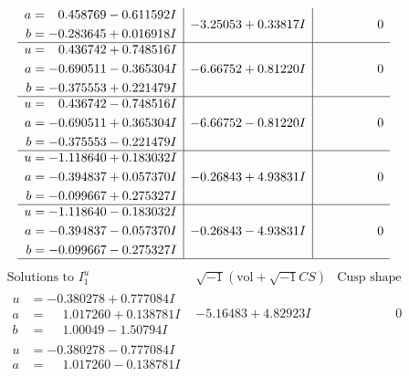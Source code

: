 \documentclass[1p]{elsarticle_modified}
\theoremstyle{definition}
\newcommand{\I}{\sqrt{-1}}
\begin{document}
$$\begin{array}{c|c|c}
\begin{aligned}
a &= \phantom{-}0.458769 - 0.611592 I \\
b &= -0.283645 + 0.016918 I\end{aligned}
 & -3.25053 + 0.33817 I & \phantom{-0.000000 } 0 \\ \hline\begin{aligned}
u &= \phantom{-}0.436742 + 0.748516 I \\
a &= -0.690511 - 0.365304 I \\
b &= -0.375553 + 0.221479 I\end{aligned}
 & -6.66752 + 0.81220 I & \phantom{-0.000000 } 0 \\ \hline\begin{aligned}
u &= \phantom{-}0.436742 - 0.748516 I \\
a &= -0.690511 + 0.365304 I \\
b &= -0.375553 - 0.221479 I\end{aligned}
 & -6.66752 - 0.81220 I & \phantom{-0.000000 } 0 \\ \hline\begin{aligned}
u &= -1.118640 + 0.183032 I \\
a &= -0.394837 + 0.057370 I \\
b &= -0.099667 + 0.275327 I\end{aligned}
 & -0.26843 + 4.93831 I & \phantom{-0.000000 } 0 \\ \hline\begin{aligned}
u &= -1.118640 - 0.183032 I \\
a &= -0.394837 - 0.057370 I \\
b &= -0.099667 - 0.275327 I\end{aligned}
 & -0.26843 - 4.93831 I & \phantom{-0.000000 } 0\\
 \hline 
 \end{array}$$\newpage$$\begin{array}{c|c|c}  
\text{Solutions to }I^u_{1}& \I (\text{vol} + \sqrt{-1}CS) & \text{Cusp shape}\\
 \hline 
\begin{aligned}
u &= -0.380278 + 0.777084 I \\
a &= \phantom{-}1.017260 + 0.138781 I \\
b &= \phantom{-}1.00049 - 1.50794 I\end{aligned}
 & -5.16483 + 4.82923 I & \phantom{-0.000000 } 0 \\ \hline\begin{aligned}
u &= -0.380278 - 0.777084 I \\
a &= \phantom{-}1.017260 - 0.138781 I \\

\end{aligned}
\end{array}$$
\end{document}
